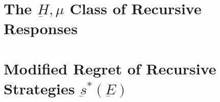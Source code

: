 \documentclass[11pt]{article}
\theoremstyle{boldStyle}
\begin{document}
\newpage
\section{The $\underbar{H}, \mu$ Class of Recursive Responses}





\newpage
\section{Modified Regret of Recursive Strategies $\underbar{s}^*(\underbar{E})$}
\end{document}

